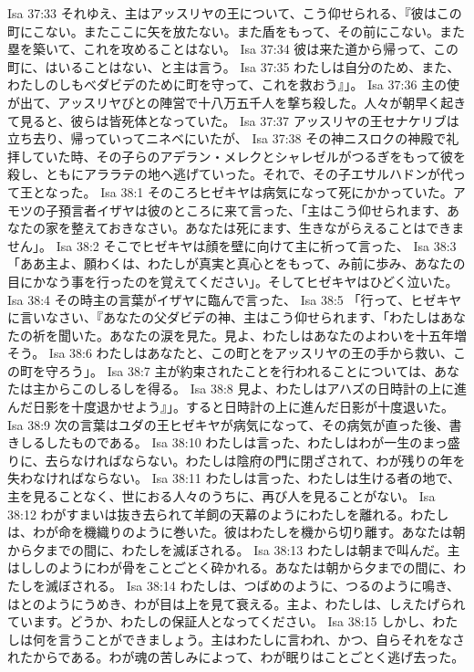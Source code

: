 Isa 37:33  それゆえ、主はアッスリヤの王について、こう仰せられる、『彼はこの町にこない。またここに矢を放たない。また盾をもって、その前にこない。また塁を築いて、これを攻めることはない。
Isa 37:34  彼は来た道から帰って、この町に、はいることはない、と主は言う。
Isa 37:35  わたしは自分のため、また、わたしのしもべダビデのために町を守って、これを救おう』」。
Isa 37:36  主の使が出て、アッスリヤびとの陣営で十八万五千人を撃ち殺した。人々が朝早く起きて見ると、彼らは皆死体となっていた。
Isa 37:37  アッスリヤの王セナケリブは立ち去り、帰っていってニネベにいたが、
Isa 37:38  その神ニスロクの神殿で礼拝していた時、その子らのアデラン・メレクとシャレゼルがつるぎをもって彼を殺し、ともにアララテの地へ逃げていった。それで、その子エサルハドンが代って王となった。
Isa 38:1  そのころヒゼキヤは病気になって死にかかっていた。アモツの子預言者イザヤは彼のところに来て言った、「主はこう仰せられます、あなたの家を整えておきなさい。あなたは死にます、生きながらえることはできません」。
Isa 38:2  そこでヒゼキヤは顔を壁に向けて主に祈って言った、
Isa 38:3  「ああ主よ、願わくは、わたしが真実と真心とをもって、み前に歩み、あなたの目にかなう事を行ったのを覚えてください」。そしてヒゼキヤはひどく泣いた。
Isa 38:4  その時主の言葉がイザヤに臨んで言った、
Isa 38:5  「行って、ヒゼキヤに言いなさい、『あなたの父ダビデの神、主はこう仰せられます、「わたしはあなたの祈を聞いた。あなたの涙を見た。見よ、わたしはあなたのよわいを十五年増そう。
Isa 38:6  わたしはあなたと、この町とをアッスリヤの王の手から救い、この町を守ろう」。
Isa 38:7  主が約束されたことを行われることについては、あなたは主からこのしるしを得る。
Isa 38:8  見よ、わたしはアハズの日時計の上に進んだ日影を十度退かせよう』」。すると日時計の上に進んだ日影が十度退いた。
Isa 38:9  次の言葉はユダの王ヒゼキヤが病気になって、その病気が直った後、書きしるしたものである。
Isa 38:10  わたしは言った、わたしはわが一生のまっ盛りに、去らなければならない。わたしは陰府の門に閉ざされて、わが残りの年を失わなければならない。
Isa 38:11  わたしは言った、わたしは生ける者の地で、主を見ることなく、世におる人々のうちに、再び人を見ることがない。
Isa 38:12  わがすまいは抜き去られて羊飼の天幕のようにわたしを離れる。わたしは、わが命を機織りのように巻いた。彼はわたしを機から切り離す。あなたは朝から夕までの間に、わたしを滅ぼされる。
Isa 38:13  わたしは朝まで叫んだ。主はししのようにわが骨をことごとく砕かれる。あなたは朝から夕までの間に、わたしを滅ぼされる。
Isa 38:14  わたしは、つばめのように、つるのように鳴き、はとのようにうめき、わが目は上を見て衰える。主よ、わたしは、しえたげられています。どうか、わたしの保証人となってください。
Isa 38:15  しかし、わたしは何を言うことができましょう。主はわたしに言われ、かつ、自らそれをなされたからである。わが魂の苦しみによって、わが眠りはことごとく逃げ去った。
